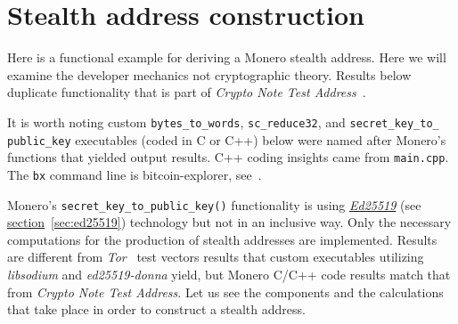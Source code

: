 \section{Stealth address construction} \label{sec:construction}
Here is a functional example for deriving a Monero stealth address. Here we will examine the developer mechanics not cryptographic theory. Results below duplicate functionality that is part of \emph{Crypto Note Test Address}~\cite{teststealth}.

It is worth noting custom \verb|bytes_to_words|, \verb|sc_reduce32|, and \verb|secret_key_to_| \verb|public_key| executables (coded in C or C++) below were named after Monero's functions that yielded output results. C++ coding insights came from \verb|main.cpp|. The \verb|bx| command line is bitcoin-explorer, see~\cite{bx}.

Monero's \verb|secret_key_to_public_key()| functionality is using \hyperref[sec:ed25519]{\emph{Ed25519}} (see \hyperref[sec:ed25519]{section}~\ref{sec:ed25519}) technology but not in an inclusive way. Only the necessary computations for the production of stealth addresses are implemented. Results are different from \emph{Tor}~\cite{tor} test vectors results that custom executables utilizing \emph{libsodium} and \emph{ed25519-donna} yield, but Monero C/C++ code results match that from \emph{Crypto Note Test Address}. Let us see the components and the calculations that take place in order to construct a stealth address.

